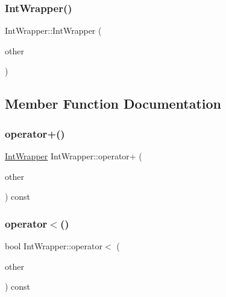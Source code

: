 \mbox{\label{classIntWrapper_af23efe3c8d8bf176948922b41e8f253e}} 
\subsubsection{\texorpdfstring{IntWrapper()}{IntWrapper()}\hspace{0.1cm}{\footnotesize\ttfamily [2/2]}}
{\footnotesize\ttfamily Int\+Wrapper\+::\+Int\+Wrapper (\begin{DoxyParamCaption}\item[{const \mbox{\hyperlink{classIntWrapper}{Int\+Wrapper}} \&}]{other }\end{DoxyParamCaption})\hspace{0.3cm}{\ttfamily [inline]}}



\subsection{Member Function Documentation}
\mbox{\label{classIntWrapper_abf97bd11dd2825f3cb9e4d9f48152b56}} 
\subsubsection{\texorpdfstring{operator+()}{operator+()}}
{\footnotesize\ttfamily \mbox{\hyperlink{classIntWrapper}{Int\+Wrapper}} Int\+Wrapper\+::operator+ (\begin{DoxyParamCaption}\item[{int}]{other }\end{DoxyParamCaption}) const\hspace{0.3cm}{\ttfamily [inline]}}

\mbox{\label{classIntWrapper_a940fd2978cdf7849281f11b32df94163}} 
\subsubsection{\texorpdfstring{operator$<$()}{operator<()}}
{\footnotesize\ttfamily bool Int\+Wrapper\+::operator$<$ (\begin{DoxyParamCaption}\item[{const \mbox{\hyperlink{classIntWrapper}{Int\+Wrapper}} \&}]{other }\end{DoxyParamCaption}) const\hspace{0.3cm}{\ttfamily [inline]}}

